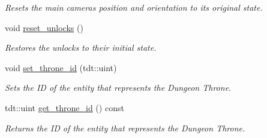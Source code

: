 \begin{DoxyCompactItemize}
\begin{DoxyCompactList}\small\item\em Resets the main camera\textquotesingle{}s position and orientation to it\textquotesingle{}s original state. \end{DoxyCompactList}\item 
void \hyperlink{class_game_a64bfdd3eb56fb04275ec65bfa3ae12f6}{reset\+\_\+unlocks} ()
\begin{DoxyCompactList}\small\item\em Restores the unlocks to their initial state. \end{DoxyCompactList}\item 
void \hyperlink{class_game_a20ded9865809df42b8e6d6dd5292351c}{set\+\_\+throne\+\_\+id} (tdt\+::uint)
\begin{DoxyCompactList}\small\item\em Sets the ID of the entity that represents the Dungeon Throne. \end{DoxyCompactList}\item 
tdt\+::uint \hyperlink{class_game_a11e7bc665ccfcd21403f8fad66deb24e}{get\+\_\+throne\+\_\+id} () const 
\begin{DoxyCompactList}\small\item\em Returns the ID of the entity that represents the Dungeon Throne. \end{DoxyCompactList}\end{DoxyCompactItemize}
